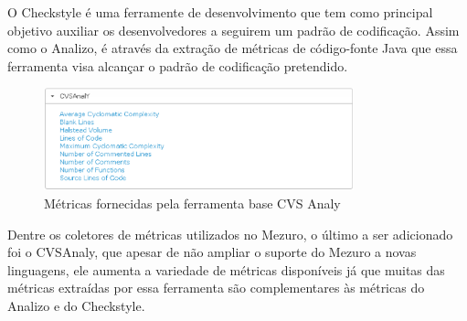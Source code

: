 O Checkstyle é uma ferramente de desenvolvimento que tem como principal objetivo auxiliar os desenvolvedores a seguirem um padrão de codificação. Assim como o Analizo, é através da extração de métricas de código-fonte Java que essa ferramenta visa alcançar o padrão de codificação pretendido.

\graphicspath{{figuras/}}
\begin{figure}[htpb]
\centering
\includegraphics[width=0.8\textwidth]{cvsanaly_bt}
\caption{Métricas fornecidas pela ferramenta base CVS Analy}
\label{fig-cvsanaly_bt}
\end{figure}

Dentre os coletores de métricas utilizados no Mezuro, o último a ser adicionado foi o CVSAnaly, que apesar de não ampliar o suporte do Mezuro a novas linguagens, ele aumenta a variedade de métricas disponíveis já que muitas das métricas extraídas por essa ferramenta são complementares às métricas do Analizo e do Checkstyle.
